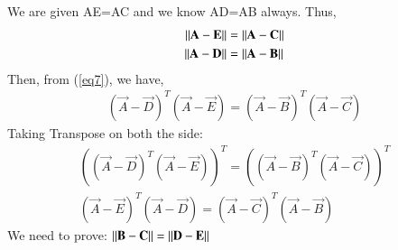 \documentclass[journal,12pt,twocolumn]{IEEEtran}
\begin{document}
We are given AE=AC and we know AD=AB always. Thus, 
\begin{align}
    \left\lVert\mathbf{A}-\mathbf{E}\right\rVert  &=  \left\lVert\mathbf{A}-\mathbf{C}\right\rVert\label{eq8}\\
    \left\lVert\mathbf{A}-\mathbf{D}\right\rVert  &=  \left\lVert\mathbf{A}-\mathbf{B}\right\rVert\label{eq9}
\end{align}
Then, from (\ref{eq7}), we have,
\begin{align}
(\vec A -\vec D)^T(\vec{A}-\vec{E}) =  (\vec A -\vec B)^T(\vec{A}-\vec{C})\label{eq10}
\end{align}
Taking Transpose on both the side:
\begin{align}
((\vec A -\vec D)^T(\vec{A}-\vec{E}))^T =  ((\vec A -\vec B)^T(\vec{A}-\vec{C}))^T\label{eq11}\\
(\vec A -\vec E)^T(\vec{A}-\vec{D}) =  (\vec A -\vec C)^T(\vec{A}-\vec{B})\label{eq12}
\end{align}
We need to prove: $\left\lVert\mathbf{B} - \mathbf{C}\right\rVert = \left\lVert\mathbf{D} - \mathbf{E}\right\rVert$ 
\end{document}
